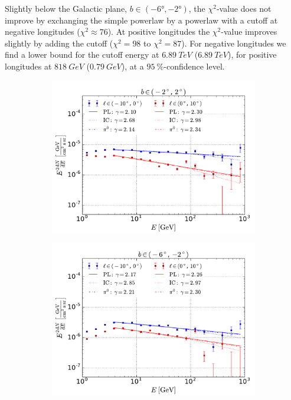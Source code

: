 Slightly below the Galactic plane, $b \in (-\ang{6}, -\ang{2})$, the $\chi^2$-value does not improve by exchanging the simple powerlaw by a powerlaw with a cutoff at negative longitudes ($\chi^2 \approx 76$). At positive longitudes the $\chi^2$-value improves slightly by adding the cutoff ($\chi^2 = 98$ to $\chi^2 = 87$). For negative longitudes we find a lower bound for the cutoff energy at $\SI{6.89}{TeV}$ ($\SI{6.89}{TeV}$), for positive longitudes at $\SI{818}{GeV}$ ($\SI{0.79}{GeV}$), at a $\SI{95}{\percent}$-confidence level.
\begin{figure}[h!]
    \begin{subfigure}{0.5\textwidth}
        \includegraphics[width=\textwidth]{plots/SED_boxes_source_0.pdf}
    \end{subfigure} 
    \begin{subfigure}{0.5\textwidth}
        \includegraphics[width=\textwidth]{plots/SED_boxes_source_-4.pdf}

\end{subfigure}
\end{figure}
